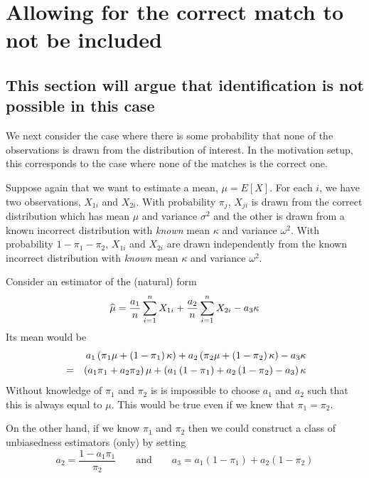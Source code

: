 \documentclass[12pt]{article}
\begin{document}
\section{Allowing for the correct match to not be included}

\subsection{This section will argue that identification is not possible in
this case}

We next consider the case where there is some probability that none of the
observations is drawn from the distribution of interest. In the motivation
setup, this corresponds to the case where none of the matches is the correct
one.

Suppose again that we want to estimate a mean, $\mu =E\left[ X\right] $. For
each $i$, we have two observations, $X_{1i}$ and $X_{2i}$. With probability $%
\pi _{j}$, $X_{ji}$ is drawn from the correct distribution which has mean $%
\mu $ and variance $\sigma ^{2}$ and the other is drawn from a known
incorrect distribution with \textsl{known} mean $\kappa $ and variance $%
\omega ^{2}$. With probability $1-\pi _{1}-\pi _{2}$, $X_{1i}$ and $X_{2i}$
are drawn independently from the known incorrect distribution with \textsl{%
known} mean $\kappa $ and variance $\omega ^{2}$.

Consider an estimator of the (natural) form
\begin{equation}
\widehat{\mu }=\frac{a_{1}}{n}\dsum\limits_{i=1}^{n}X_{1i}+\frac{a_{2}}{n}%
\dsum\limits_{i=1}^{n}X_{2i}-a_{3}\kappa  \label{muhat2}
\end{equation}%
Its mean would be
\begin{eqnarray}
&&a_{1}\left( \pi _{1}\mu +\left( 1-\pi _{1}\right) \kappa \right)
+a_{2}\left( \pi _{2}\mu +\left( 1-\pi _{2}\right) \kappa \right)
-a_{3}\kappa  \notag \\
&=&\left( a_{1}\pi _{1}+a_{2}\pi _{2}\right) \mu +\left( a_{1}\left( 1-\pi
_{1}\right) +a_{2}\left( 1-\pi _{2}\right) -a_{3}\right) \kappa
\label{mean2}
\end{eqnarray}%
Without knowledge of $\pi _{1}$ and $\pi _{2}$ is is impossible to choose $%
a_{1}$ and $a_{2}$ such that this is always equal to $\mu $. This would be
true even if we knew that $\pi _{1}=\pi _{2}$.

On the other hand, if we know $\pi _{1}$ and $\pi _{2}$ then we could
construct a class of unbiasedness estimators (only) by setting
\begin{equation*}
a_{2}=\frac{1-a_{1}\pi _{1}}{\pi _{2}}\qquad \text{and}\qquad
a_{3}=a_{1}\left( 1-\pi _{1}\right) +a_{2}\left( 1-\pi _{2}\right)
\end{equation*}
\end{document}
